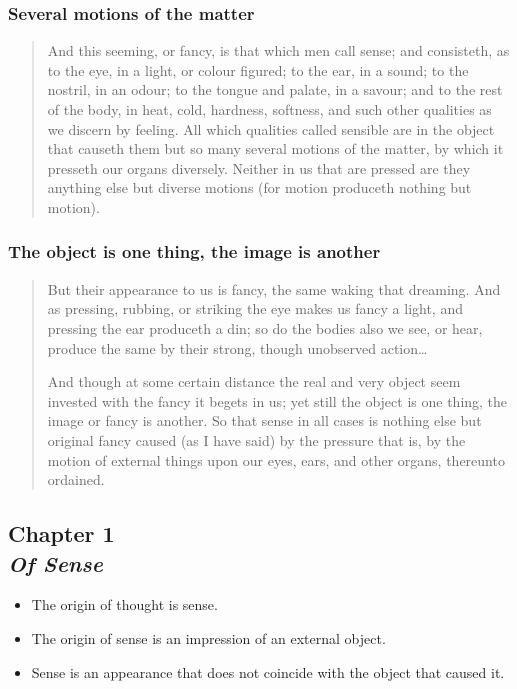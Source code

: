         \subsubsection{Several motions of the matter}

            \begin{quote}
                And this seeming, or fancy, is that which men call sense; and consisteth, as to the eye, in a light, or colour figured; to the ear, in a sound; to the nostril, in an odour; to the tongue and palate, in a savour; and to the rest of the body, in heat, cold, hardness, softness, and such other qualities as we discern by feeling. All which qualities called sensible are in the object that causeth them but so many several motions of the matter, by which it presseth our organs diversely. Neither in us that are pressed are they anything else but diverse motions (for motion produceth nothing but motion).
            \end{quote}

        \subsubsection{The object is one thing, the image is another}

            \begin{quote}
                But their appearance to us is fancy, the same waking that dreaming. And as pressing, rubbing, or striking the eye makes us fancy a light, and pressing the ear produceth a din; so do the bodies also we see, or hear, produce the same by their strong, though unobserved action…

                And though at some certain distance the real and very object seem invested with the fancy it begets in us; yet still the object is one thing, the image or fancy is another. So that sense in all cases is nothing else but original fancy caused (as I have said) by the pressure that is, by the motion of external things upon our eyes, ears, and other organs, thereunto ordained.
            \end{quote}

    \subsection[Of Sense]{Chapter 1 \\ \textit{Of Sense}}

        \begin{remark}
            \begin{itemize}
                \item The origin of thought is sense.
                \item The origin of sense is an impression of an external object.
                \item Sense is an appearance that does not coincide with the object that caused it.
            \end{itemize}
        \end{remark}

